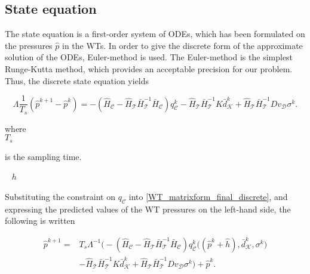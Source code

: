  \subsection{State equation}
\label{state_eq_identification} 

The state equation is a first-order system of ODEs, which has been formulated on the pressures $\hat{p}$ in the WTs. In order to give the discrete form of the approximate solution of the ODEs, Euler-method is used. The Euler-method is the simplest Runge-Kutta method, which provides an acceptable precision for our problem\cite{chicone2006ordinary}. Thus, the discrete state equation yields

\begin{equation}
  \label{WT_matrixform_final_discrete}
\Lambda \frac{1}{T_s} (\hat{p}^{k+1} - \hat{p}^{k})  = - (\hat{H}_{\mathcal{C}} - \hat{H}_{\mathcal{T}} \bar{H}^{-1}_{\mathcal{T}}\bar{H}_{\mathcal{C}})  q^{k}_{\mathcal{C}} - \hat{H}_{\mathcal{T}} \bar{H}^{-1}_{\mathcal{T}} K \bar{d}^{k}_{\mathcal{K}} + \hat{H}_{\mathcal{T}} \bar{H}^{-1}_{\mathcal{T}} D v_{\mathcal{D}} \sigma^{k}.
\end{equation}

\begin{minipage}[t]{0.20\textwidth}
where\\
\hspace*{8mm} $T_s$
\end{minipage}
\begin{minipage}[t]{0.68\textwidth}
\vspace*{2mm}
 is the sampling time.
\end{minipage}
\begin{minipage}[t]{0.10\textwidth}
\vspace*{2mm}
\textcolor{White}{te}$\unit{h}$
\end{minipage} 

Substituting the constraint on $q_{\mathcal{C}}$ into \eqref{WT_matrixform_final_discrete}, and expressing the predicted values of the WT pressures on the left-hand side, the following is written

\vspace{-4mm}
\begin{align}
\label{WT_matrixform_final_discrete1}
\nonumber  \hat{p}^{k+1}  =& T_s \Lambda^{-1} \big(- (\hat{H}_{\mathcal{C}} - \hat{H}_{\mathcal{T}} \bar{H}^{-1}_{\mathcal{T}}\bar{H}_{\mathcal{C}})  q^{k}_{\mathcal{C}}\big ((\hat{p}^{k} + \hat{h}),\bar{d}^{k}_{\mathcal{K}}, \sigma^{k} \big) \\ & - \hat{H}_{\mathcal{T}} \bar{H}^{-1}_{\mathcal{T}} K \bar{d}^{k}_{\mathcal{K}} + \hat{H}_{\mathcal{T}} \bar{H}^{-1}_{\mathcal{T}} D v_{\mathcal{D}} \sigma^{k} \big) + \hat{p}^{k} .
\end{align}
\vspace{-4mm}


